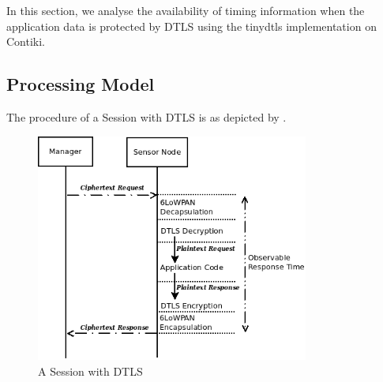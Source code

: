 In this section, we analyse the availability of timing information when the application data is protected by DTLS using the tinydtls implementation on Contiki.

\subsection{Processing Model}

The procedure of a Session with DTLS is as depicted by .

\begin{figure}[ht!]
	\center
	\includegraphics[width=0.8\textwidth]{fig/dtls_session.png}
	\caption{A Session with DTLS}
	\label{Fig: A Session with DTLS}
\end{figure}






